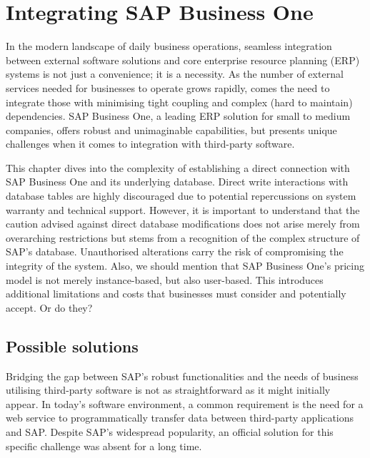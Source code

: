 \chapter{Integrating SAP Business One}
\label{chap:integrating-sap-b1}

In the modern landscape of daily business operations, seamless integration between external software solutions and core enterprise resource planning (ERP) systems is not just a convenience; it is a necessity.
As the number of external services needed for businesses to operate grows rapidly, comes the need to integrate those with minimising tight coupling and complex (hard to maintain) dependencies.
SAP Business One, a leading ERP solution for small to medium companies, offers robust and unimaginable capabilities, but presents unique challenges when it comes to integration with third-party software. 

This chapter dives into the complexity of establishing a direct connection with SAP Business One and its underlying database. 
Direct write interactions with database tables are highly discouraged due to potential repercussions on system warranty and technical support.
However, it is important to understand that the caution advised against direct database modifications does not arise merely from overarching restrictions but stems from a recognition of the complex structure of SAP's database. Unauthorised alterations carry the risk of compromising the integrity of the system.
Also, we should mention that SAP Business One's pricing model is not merely instance-based, but also user-based.
This introduces additional limitations and costs that businesses must consider and potentially accept. 
Or do they?

\section{Possible solutions}
\label{sec:possible-solutions}

Bridging the gap between SAP's robust functionalities and the needs of business utilising third-party software is not as straightforward as it might initially appear. 
In today's software environment, a common requirement is the need for a web service to programmatically transfer data between third-party applications and SAP.
Despite SAP's widespread popularity, an official solution for this specific challenge was absent for a long time.

